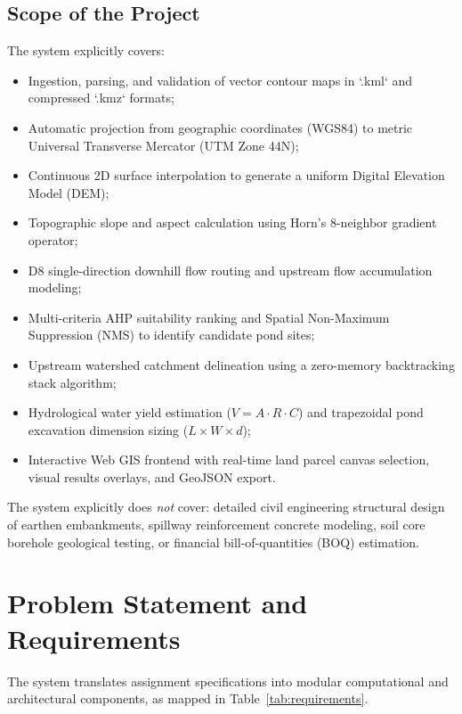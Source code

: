 \documentclass[manuscript,screen,review]{acmart}
\begin{document}
\subsection{Scope of the Project}
The system explicitly covers:
\begin{itemize}
    \item Ingestion, parsing, and validation of vector contour maps in `.kml` and compressed `.kmz` formats;
    \item Automatic projection from geographic coordinates (WGS84) to metric Universal Transverse Mercator (UTM Zone 44N);
    \item Continuous 2D surface interpolation to generate a uniform Digital Elevation Model (DEM);
    \item Topographic slope and aspect calculation using Horn's 8-neighbor gradient operator;
    \item D8 single-direction downhill flow routing and upstream flow accumulation modeling;
    \item Multi-criteria AHP suitability ranking and Spatial Non-Maximum Suppression (NMS) to identify candidate pond sites;
    \item Upstream watershed catchment delineation using a zero-memory backtracking stack algorithm;
    \item Hydrological water yield estimation ($V = A \cdot R \cdot C$) and trapezoidal pond excavation dimension sizing ($L \times W \times d$);
    \item Interactive Web GIS frontend with real-time land parcel canvas selection, visual results overlays, and GeoJSON export.
\end{itemize}
The system explicitly does \emph{not} cover: detailed civil engineering structural design of earthen embankments, spillway reinforcement concrete modeling, soil core borehole geological testing, or financial bill-of-quantities (BOQ) estimation.

\section{Problem Statement and Requirements}
\label{sec:requirements}

The system translates assignment specifications into modular computational and architectural components, as mapped in Table~\ref{tab:requirements}.
\end{document}
